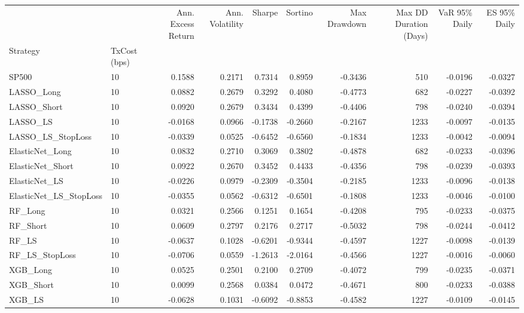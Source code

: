 \begin{tabular}{llrrrrrrrr}
\toprule
 &  & Ann. Excess Return & Ann. Volatility & Sharpe & Sortino & Max Drawdown & Max DD Duration (Days) & VaR 95\% Daily & ES 95\% Daily \\
Strategy & TxCost (bps) &  &  &  &  &  &  &  &  \\
\midrule
SP500 & 10 & 0.1588 & 0.2171 & 0.7314 & 0.8959 & -0.3436 & 510 & -0.0196 & -0.0327 \\
\cline{1-10}
LASSO\_Long & 10 & 0.0882 & 0.2679 & 0.3292 & 0.4080 & -0.4773 & 682 & -0.0227 & -0.0392 \\
\cline{1-10}
LASSO\_Short & 10 & 0.0920 & 0.2679 & 0.3434 & 0.4399 & -0.4406 & 798 & -0.0240 & -0.0394 \\
\cline{1-10}
LASSO\_LS & 10 & -0.0168 & 0.0966 & -0.1738 & -0.2660 & -0.2167 & 1233 & -0.0097 & -0.0135 \\
\cline{1-10}
LASSO\_LS\_StopLoss & 10 & -0.0339 & 0.0525 & -0.6452 & -0.6560 & -0.1834 & 1233 & -0.0042 & -0.0094 \\
\cline{1-10}
ElasticNet\_Long & 10 & 0.0832 & 0.2710 & 0.3069 & 0.3802 & -0.4878 & 682 & -0.0233 & -0.0396 \\
\cline{1-10}
ElasticNet\_Short & 10 & 0.0922 & 0.2670 & 0.3452 & 0.4433 & -0.4356 & 798 & -0.0239 & -0.0393 \\
\cline{1-10}
ElasticNet\_LS & 10 & -0.0226 & 0.0979 & -0.2309 & -0.3504 & -0.2185 & 1233 & -0.0096 & -0.0138 \\
\cline{1-10}
ElasticNet\_LS\_StopLoss & 10 & -0.0355 & 0.0562 & -0.6312 & -0.6501 & -0.1808 & 1233 & -0.0046 & -0.0100 \\
\cline{1-10}
RF\_Long & 10 & 0.0321 & 0.2566 & 0.1251 & 0.1654 & -0.4208 & 795 & -0.0233 & -0.0375 \\
\cline{1-10}
RF\_Short & 10 & 0.0609 & 0.2797 & 0.2176 & 0.2717 & -0.5032 & 798 & -0.0244 & -0.0412 \\
\cline{1-10}
RF\_LS & 10 & -0.0637 & 0.1028 & -0.6201 & -0.9344 & -0.4597 & 1227 & -0.0098 & -0.0139 \\
\cline{1-10}
RF\_LS\_StopLoss & 10 & -0.0706 & 0.0559 & -1.2613 & -2.0164 & -0.4566 & 1227 & -0.0016 & -0.0060 \\
\cline{1-10}
XGB\_Long & 10 & 0.0525 & 0.2501 & 0.2100 & 0.2709 & -0.4072 & 799 & -0.0235 & -0.0371 \\
\cline{1-10}
XGB\_Short & 10 & 0.0099 & 0.2568 & 0.0384 & 0.0472 & -0.4671 & 800 & -0.0233 & -0.0388 \\
\cline{1-10}
XGB\_LS & 10 & -0.0628 & 0.1031 & -0.6092 & -0.8853 & -0.4582 & 1227 & -0.0109 & -0.0145 \\

\end{tabular}
